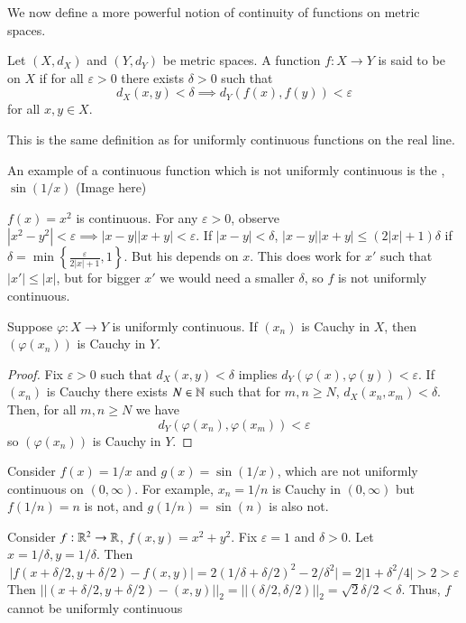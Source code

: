 We now define a more powerful notion of continuity of functions on metric spaces.

\begin{defn}
    Let $(X,d_X)$ and $(Y,d_Y)$ be metric spaces. A function $f:X\rightarrow Y$ is said to be  on $X$ if for all $\varepsilon > 0$ there exists $\delta > 0$ such that $$d_X(x,y) < \delta \implies d_Y(f(x),f(y)) < \varepsilon$$ for all $x,y \in X$.
\end{defn}

This is the same definition as for uniformly continuous functions on the real line.

\begin{eg}
    An example of a continuous function which is not uniformly continuous is the , $\sin(1/x)$ (Image here)
\end{eg}

\begin{eg}
    $f(x) = x^2$ is continuous. For any $\varepsilon > 0$, observe $|x^2 - y^2| < \varepsilon \implies |x-y||x+y| < \varepsilon$. If $|x-y| < \delta$, $|x-y||x+y| \leq (2|x|+1)\delta$ if $\delta = \min\left\{\frac{\varepsilon}{2|x|+1},1\right\}$. But his depends on $x$. This does work for $x'$ such that $|x'| \leq |x|$, but for bigger $x'$ we would need a smaller $\delta$, so $f$ is not uniformly continuous.
\end{eg}

\begin{prop}
    Suppose $\varphi:X\rightarrow Y$ is uniformly continuous. If $(x_n)$ is Cauchy in $X$, then $(\varphi(x_n))$ is Cauchy in $Y$.
\end{prop}
\begin{proof}
    Fix $\varepsilon > 0$ such that $d_X(x,y) < \delta$ implies $d_Y(\varphi(x),\varphi(y)) < \varepsilon$. If $(x_n)$ is Cauchy there exists $N \in \mathbb N$ such that for $m,n \geq N$, $d_X(x_n,x_m) < \delta$. Then, for all $m,n \geq N$ we have $$d_Y(\varphi(x_n),\varphi(x_m)) < \varepsilon$$ so $(\varphi(x_n))$ is Cauchy in $Y$.
\end{proof}

\begin{eg}
    Consider $f(x) = 1/x$ and $g(x) = \sin(1/x)$, which are not uniformly continuous on $(0,\infty)$. For example, $x_n = 1/n$ is Cauchy in $(0,\infty)$ but $f(1/n) = n$ is not, and $g(1/n) = \sin(n)$ is also not.
\end{eg}

\begin{eg}
    Consider $f:\mathbb R^2\rightarrow \mathbb R$, $f(x,y) = x^2+y^2$. Fix $\varepsilon = 1$ and $\delta > 0$. Let $x = 1/\delta,y = 1/\delta$. Then $$|f(x+\delta/2,y+\delta/2) - f(x,y)| = 2(1/\delta + \delta/2)^2 - 2/\delta^2| = 2|1 + \delta^2/4| > 2  > \varepsilon$$ Then $||(x+\delta/2,y+\delta/2) - (x,y)||_2 = ||(\delta/2,\delta/2)||_2 = \sqrt{2}\delta/2 < \delta$. Thus, $f$ cannot be uniformly continuous
\end{eg}

